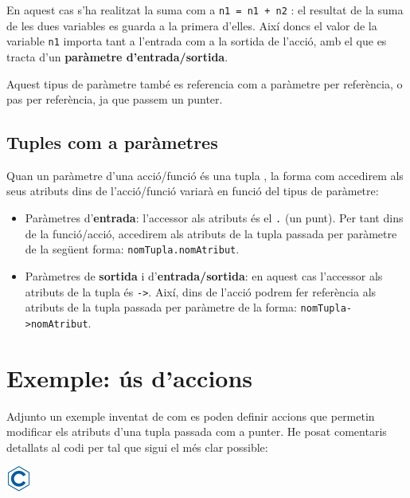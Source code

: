 \documentclass[]{book}
\providecommand{\tightlist}{%
  \setlength{\itemsep}{0pt}\setlength{\parskip}{0pt}}
\begin{document}
En aquest cas s'ha realitzat la suma com a \texttt{n1\ =\ n1\ +\ n2} :
el resultat de la suma de les dues variables es guarda a la primera
d'elles. Així doncs el valor de la variable \texttt{n1} importa tant a
l'entrada com a la sortida de l'acció, amb el que es tracta d'un
\textbf{paràmetre d'entrada/sortida}.

Aquest tipus de paràmetre també es referencia com a paràmetre per
referència, o pas per referència, ja que passem un punter.

\subsection{Tuples com a paràmetres}\label{tuples-com-a-parametres}

Quan un paràmetre d'una acció/funció és una tupla , la forma com
accedirem als seus atributs dins de l'acció/funció variarà en funció del
tipus de paràmetre:

\begin{itemize}
\tightlist
\item
  Paràmetres d'\textbf{entrada}: l'accessor als atributs és el
  \texttt{.} (un punt). Per tant dins de la funció/acció, accedirem als
  atributs de la tupla passada per paràmetre de la següent forma:
  \texttt{nomTupla.nomAtribut}.
\item
  Paràmetres de \textbf{sortida} i d'\textbf{entrada/sortida}: en aquest
  cas l'accessor als atributs de la tupla és \texttt{-\textgreater{}}.
  Així, dins de l'acció podrem fer referència als atributs de la tupla
  passada per paràmetre de la forma:
  \texttt{nomTupla-\textgreater{}nomAtribut}.
\end{itemize}

\section{Exemple: ús d'accions}\label{exemple-us-daccions}

Adjunto un exemple inventat de com es poden definir accions que permetin
modificar els atributs d'una tupla passada com a punter. He posat
comentaris detallats al codi per tal que sigui el més clar possible:

\includegraphics{./img/c.png}
\end{document}
